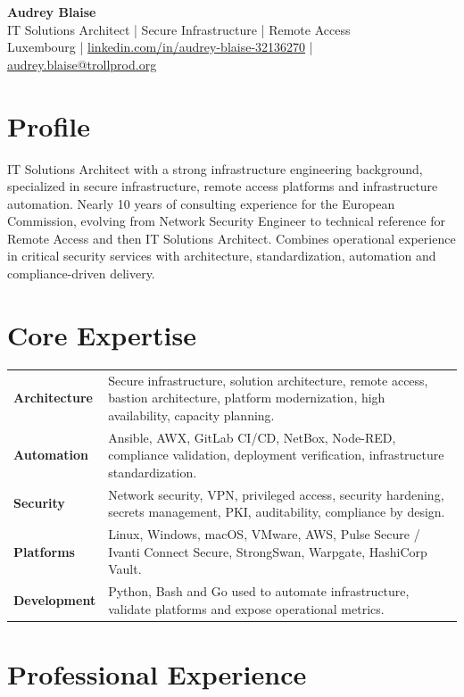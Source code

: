 \documentclass[10pt,a4paper]{article}
\newcommand{\cvheader}[4]{
  {\LARGE\bfseries #1}\\[3pt]
  {\large #2}\\[5pt]
  #3 \quad | \quad \href{mailto:#4}{#4}\\[3pt]
}
\begin{document}
\cvheader
  {Audrey Blaise}
  {IT Solutions Architect | Secure Infrastructure | Remote Access}
  {Luxembourg | \href{https://www.linkedin.com/in/audrey-blaise-32136270}{linkedin.com/in/audrey-blaise-32136270}}
  {audrey.blaise@trollprod.org}

\section{Profile}

IT Solutions Architect with a strong infrastructure engineering background, specialized in secure infrastructure, remote access platforms and infrastructure automation. Nearly 10 years of consulting experience for the European Commission, evolving from Network Security Engineer to technical reference for Remote Access and then IT Solutions Architect. Combines operational experience in critical security services with architecture, standardization, automation and compliance-driven delivery.

\section{Core Expertise}

\begin{tabularx}{\textwidth}{@{}>{\bfseries}p{3.3cm}X@{}}
Architecture & Secure infrastructure, solution architecture, remote access, bastion architecture, platform modernization, high availability, capacity planning.\\
Automation & Ansible, AWX, GitLab CI/CD, NetBox, Node-RED, compliance validation, deployment verification, infrastructure standardization.\\
Security & Network security, VPN, privileged access, security hardening, secrets management, PKI, auditability, compliance by design.\\
Platforms & Linux, Windows, macOS, VMware, AWS, Pulse Secure / Ivanti Connect Secure, StrongSwan, Warpgate, HashiCorp Vault.\\
Development & Python, Bash and Go used to automate infrastructure, validate platforms and expose operational metrics.\\
\end{tabularx}

\section{Professional Experience}
\end{document}
